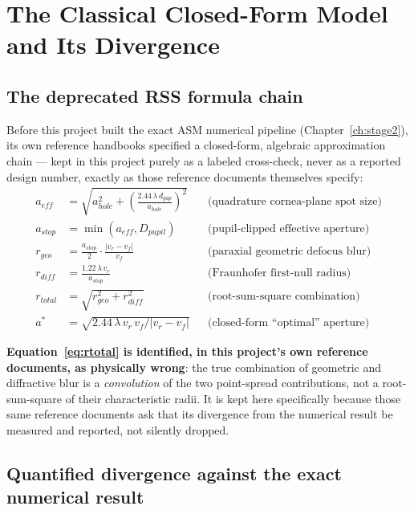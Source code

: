 \chapter{The Classical Closed-Form Model and Its Divergence}
\label{ch:classical_model}

\section{The deprecated RSS formula chain}

Before this project built the exact ASM numerical pipeline (Chapter~\ref{ch:stage2}),
its own reference handbooks specified a closed-form, algebraic approximation chain ---
kept in this project purely as a labeled cross-check, never as a reported design
number, exactly as those reference documents themselves specify:
\begin{align}
a_{eff} &= \sqrt{a_{hole}^2 + \left(\frac{2.44\,\lambda\, d_{gap}}{a_{hole}}\right)^2}
  &&\text{(quadrature cornea-plane spot size)}\label{eq:aeff}\\
a_{stop} &= \min(a_{eff}, D_{pupil}) &&\text{(pupil-clipped effective aperture)}\\
r_{geo} &= \frac{a_{stop}}{2}\cdot\frac{|v_r-v_f|}{v_f} &&\text{(paraxial geometric defocus blur)}\label{eq:rgeo}\\
r_{diff} &= \frac{1.22\,\lambda\, v_r}{a_{stop}} &&\text{(Fraunhofer first-null radius)}\label{eq:rdiff}\\
r_{total} &= \sqrt{r_{geo}^2 + r_{diff}^2} &&\text{(root-sum-square combination)}\label{eq:rtotal}\\
a^\ast &= \sqrt{2.44\,\lambda\, v_r\, v_f / |v_r-v_f|} &&\text{(closed-form ``optimal'' aperture)}\label{eq:astar}
\end{align}

\textbf{Equation~\eqref{eq:rtotal} is identified, in this project's own reference
documents, as physically wrong}: the true combination of geometric and diffractive
blur is a \emph{convolution} of the two point-spread contributions, not a
root-sum-square of their characteristic radii. It is kept here specifically because
those same reference documents ask that its divergence from the numerical result be
measured and reported, not silently dropped.

\section{Quantified divergence against the exact numerical result}

